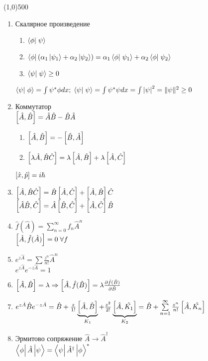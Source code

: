 


\fontsize{20}{24}
\line(1,0){500}
\fontsize{12}{15}
\begin{enumerate}
\item Скалярное произведение
	\begin{enumerate}
	     \item $\braket{\phi}{\psi}$
            \item $\bra{\phi}(\alpha_1\ket{\psi_1}+\alpha_2\ket{\psi_2})=\alpha_1\braket{\phi}{\psi_1}+\alpha_2\braket{\phi}{\psi_2}$
            \item $\braket{\psi}{\psi}\geq 0$
	\end{enumerate}
      $\braket{\psi}{\phi}=\int\psi^*\phi dx;\;\braket{\psi}{\psi}=\int\psi^*\psi dx =\int\abs{\psi}^2=\qnorm{\psi}\geq 0$
\item Коммутатор\\
      $\left[ \hat{A}, \hat{B} \right]=\hat{A}\hat{B}-\hat{B}\hat{A}$
      \begin{enumerate}
            \item $ \left[ \hat{A}, \hat{B} \right]=-\left[ \hat{B}, \hat{A} \right] $
            \item $ \left[ \lambda\hat{A},\hat{B}\hat{C} \right] = \lambda\left[ \hat{A}, \hat{B} \right] + \lambda\left[ \hat{A}, \hat{C} \right] $
      \end{enumerate}
      $\left[ \hat{x}, \hat{p} \right]=i\hbar$
\item $ \left[ \hat{A}, \hat{B}\hat{C} \right] = \hat{B}\left[ \hat{A}, \hat{C} \right] + \left[ \hat{A}, \hat{B} \right]\hat{C} $\\
      $ \left[ \hat{A}\hat{B}, \hat{C} \right] = \hat{A}\left[ \hat{B}, \hat{C} \right] + \left[ \hat{A}, \hat{C} \right]\hat{B} $
\item $ \hat{f}(\hat{A})=\sum\limits_{n=0}^{\infty}f_n \hat{A}^n $\\
      $\left[ \hat{A}, \hat{f}(\hat{A}) \right] = 0\;\forall f $
\item $ e^{z\hat{A}}=\sum \frac{z^n}{n!}\hat{A}^n $ \\
      $ e^{z\hat{A}}e^{-z\hat{A}} = 1 $
\item $ \left[ \hat{A}, \hat{B} \right]=\lambda \Rightarrow \left[ \hat{A}, \hat{f}(\hat{B}) \right]=\lambda \frac{\partial \hat{f}(\hat{B})}{\partial \hat{B}} $
\item $ e^{z\hat{A}}\hat{B}e^{-z\hat{A}} = \hat{B} + \frac{z}{1!}\underbrace{\left[ \hat{A}, \hat{B} \right]}_{K_1} + \frac{z^2}{2!}\underbrace{\left[ \hat{A}, \hat{K_1} \right]}_{K_2} = \hat{B}+\sum\limits_{n=1}^{\infty}\frac{z^n}{n!}\left[ \hat{A}, \hat{K_n} \right] $
\item Эрмитово сопряжение $\hat{A}\rightarrow\hat{A}^\dagger $\\
      $ \matrixel{\phi}{\hat{A}}{\psi} = \matrixel{\psi}{\hat{A}^\dagger}{\phi}^* $\\

\end{enumerate}
